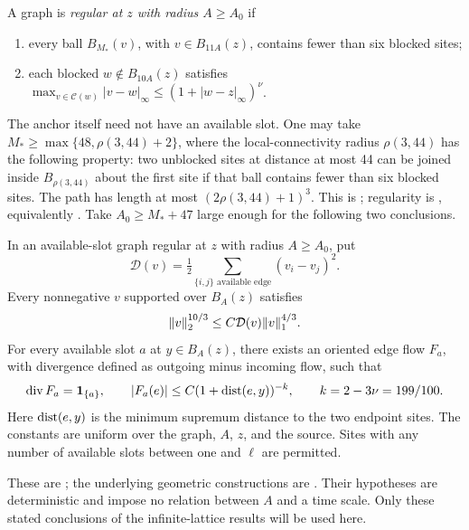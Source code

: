 A graph is \emph{regular at \(z\) with radius \(A\ge A_0\)} if
\begin{enumerate}[label=(\roman*)]
 \item every ball \(B_{M_*}(v)\), with \(v\in B_{11A}(z)\),
 contains fewer than six blocked sites;
 \item each blocked \(w\notin B_{10A}(z)\) satisfies
 \(\max_{v\in\mathcal C(w)}|v-w|_\infty
       \le(1+|w-z|_\infty)^\nu\).
\end{enumerate}
The anchor itself need not have an available slot.
One may take \(M_*\ge\max\{48,\rho(3,44)+2\}\), where the
local-connectivity radius \(\rho(3,44)\) has the following property:
two unblocked sites at distance at most 44 can be joined inside
\(B_{\rho(3,44)}\) about the first site if that ball contains fewer
than six blocked sites.  The path has length at most
\((2\rho(3,44)+1)^3\).  This is
\cite[Lemma~5.5 and Equation~(5.13)]{Ord}; regularity is
\cite[Definition~3.2]{BL}, equivalently
\cite[Definition~5.3]{Ord}.  Take \(A_0\ge M_*+47\) large enough
for the following two conclusions.

\begin{lemma}\label{lem:lattice-inputs}
In an available-slot graph regular at \(z\) with radius \(A\ge A_0\),
put
\[
 \mathcal D(v)=\tfrac12\sum_{\{i,j\}\text{ available edge}}
                              (v_i-v_j)^2.
\]
Every nonnegative \(v\) supported over \(B_A(z)\) satisfies
\begin{equation}\label{eq:local-nash}
 \lVert v\rVert_2^{10/3}\le C\mathcal D(v)\lVert v\rVert_1^{4/3}.
\end{equation}
For every available slot \(a\) at \(y\in B_A(z)\), there exists
an oriented edge flow \(F_a\), with divergence defined as outgoing
minus incoming flow, such that
\begin{equation}\label{eq:unit-flow}
 \operatorname{div} F_a=\mathbf1_{\{a\}},\qquad
 |F_a(e)|\le C(1+\operatorname{dist}(e,y))^{-k},\qquad
 k=2-3\nu=199/100.
\end{equation}
Here \(\operatorname{dist}(e,y)\) is the minimum supremum distance to the two
endpoint sites.  The constants are uniform over the graph, \(A\),
\(z\), and the source.  Sites with any number of available slots
between one and \(\ell\) are permitted.
\end{lemma}

These are \cite[Proposition~3.3 and Lemma~3.4]{BL}; the underlying
geometric constructions are \cite[Propositions~5.6 and~6.2]{Ord}.
Their hypotheses are deterministic and impose no relation between
\(A\) and a time scale.  Only these stated conclusions of the
infinite-lattice results will be used here.

